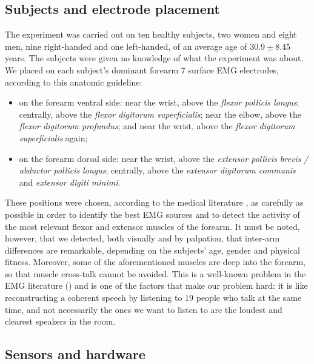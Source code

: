 \documentclass[10pt]{bmc_article}
\newenvironment{bmcformat}{\begin{raggedright}\baselineskip20pt\sloppy\setboolean{publ}{false}}{\end{raggedright}\baselineskip20pt\sloppy}
\begin{document}
\begin{bmcformat}
\subsection*{Subjects and electrode placement}

The experiment was carried out on ten healthy subjects, two women and
eight men, nine right-handed and one left-handed, of an average age of
$30.9 \pm 8.45$ years. The subjects were given no knowledge of what
the experiment was about. We placed on each subject's dominant forearm
$7$ surface EMG electrodes, according to this anatomic guideline:

\begin{itemize}

  \item on the forearm ventral side: near the wrist, above the
    \emph{flexor pollicis longus}; centrally, above the \emph{flexor
    digitorum superficialis}; near the elbow, above the \emph{flexor
    digitorum profundus}; and near the wrist, above the \emph{flexor
    digitorum superficialis} again;

  \item on the forearm dorsal side: near the wrist, above the
    \emph{extensor pollicis brevis / abductor pollicis longus};
    centrally, above the \emph{extensor digitorum communis} and
    \emph{extensor digiti minimi}.

\end{itemize}

These positions were chosen, according to the medical literature
\cite{Kendall},
as carefully as possible in order to identify the best EMG sources and
to detect the activity of the most relevant flexor and extensor
muscles of the forearm. It must be noted, however, that we detected,
both visually and by palpation, that inter-arm differences are
remarkable, depending on the subjects' age, gender and physical
fitness. Moreover, some of the aforementioned muscles are deep into
the forearm, so that muscle cross-talk cannot be avoided. This is a
well-known problem in the EMG literature (\cite{deluca,zecca}) and is
one of the factors that make our problem hard: it is like
reconstructing a coherent speech by listening to $19$ people who talk
at the same time, and not necessarily the ones we want to listen to
are the loudest and clearest speakers in the room.

\subsection*{Sensors and hardware}


\end{bmcformat}
\end{document}
